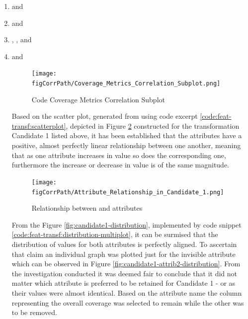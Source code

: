 \begin{enumerate}\label{lst:corr-sub:code-coverage-transf-candidates}
    \item \overallBranchCoverage{} and \branchCoverage{}
    \item \overallUncoveredLines{} and \uncoveredLines{}
    \item \overallCoverage{}, \overallLineCoverage{}, \coverage{} and \lineCoverage{}
    \item \overallUncoveredConditions and \uncoveredConditions{}

\begin{figure}[!h]
    \centering
    \texttt{[image: \\figCorrPath/Coverage\_Metrics\_Correlation\_Subplot.png]}
    \caption{Code Coverage Metrics Correlation Subplot}
    \label{fig:correlation-coverage-metrics-subplot}
\end{figure}
\FloatBarrier

Based on the scatter plot, generated from using code excerpt \ref{code:feat-transf:scatterplot}, depicted in Figure \ref{fig:candidate1-scatterplot} constructed for the transformation Candidate 1 listed above, it has been established that the attributes have a positive, almost perfectly linear relationship between one another, meaning that as one attribute increases in value so does the corresponding one, furthermore the increase or decrease in value is of the same magnitude.
\begin{figure}[!h]
    \centering
    \texttt{[image: \\figCorrPath/Attribute\_Relationship\_in\_Candidate\_1.png]}
    \caption{Relationship between \overallBranchCoverage{} and \branchCoverage{} attributes}
    \label{fig:candidate1-scatterplot}
\end{figure}

From the Figure \ref{fig:candidate1-distribution}, implemented by code snippet \ref{code:feat-transf:distribution-multiplot}, it can be surmised that the distribution of values for both attributes is perfectly aligned. To ascertain that claim an individual graph was plotted just for the invisible attribute \overallBranchCoverage{} which can be observed in Figure \ref{fig:candidate1-attrib2-distribution}.
From the investigation conducted it was deemed fair to conclude that it did not matter which attribute is preferred to be retained for Candidate 1 - \overallBranchCoverage{} or \branchCoverage{} as their values were almost identical. Based on the attribute name the column representing the overall coverage was selected to remain while the other was to be removed.


\end{enumerate}
